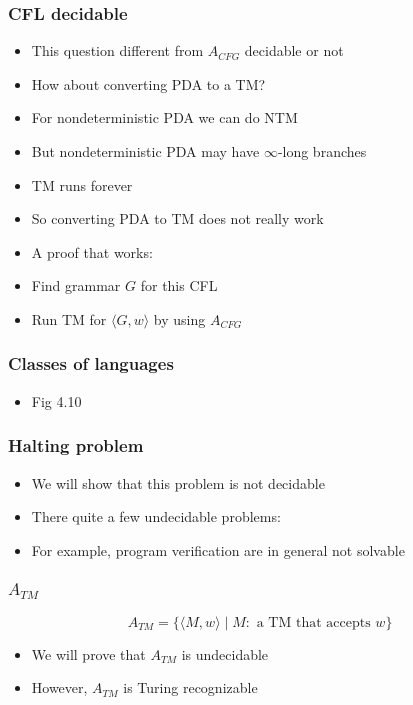 \begin{frame}[allowframebreaks] \frametitle{CFL decidable}
  \begin{itemize}
\item This question different from $A_{CFG}$ decidable
or not
\item How about converting PDA to a TM?
\item For nondeterministic PDA we can do NTM 
\item But nondeterministic PDA may have $\infty$-long branches

\item [] TM runs forever
\item So converting PDA to TM does not really work
\item A proof that works:

\item [] Find grammar $G$ for this CFL
\item [] Run TM for $\langle  G,w\rangle $ by using 
$A_{CFG}$
\end{itemize}\end{frame} \begin{frame}[allowframebreaks] \frametitle{Classes of languages}
  \begin{itemize}
  \item Fig 4.10

\begin{center}
    \end{center}
\end{itemize}\end{frame} \begin{frame}[allowframebreaks] \frametitle{Halting problem}
  \begin{itemize}
\item We will show that this problem is not decidable
\item There quite a few undecidable problems:

\item [] For example, program verification are in general not solvable
\end{itemize}\end{frame} \begin{frame}[allowframebreaks] \frametitle{$A_{TM}$}
\begin{equation*}
  A_{TM}=\{
\langle  M,w\rangle \mid M: \mbox{ a TM that accepts } w\}
\end{equation*}
  \begin{itemize}
\item We will prove that $A_{TM}$ is undecidable
\item However, $A_{TM}$ is Turing recognizable


\end{itemize}
\end{frame}
